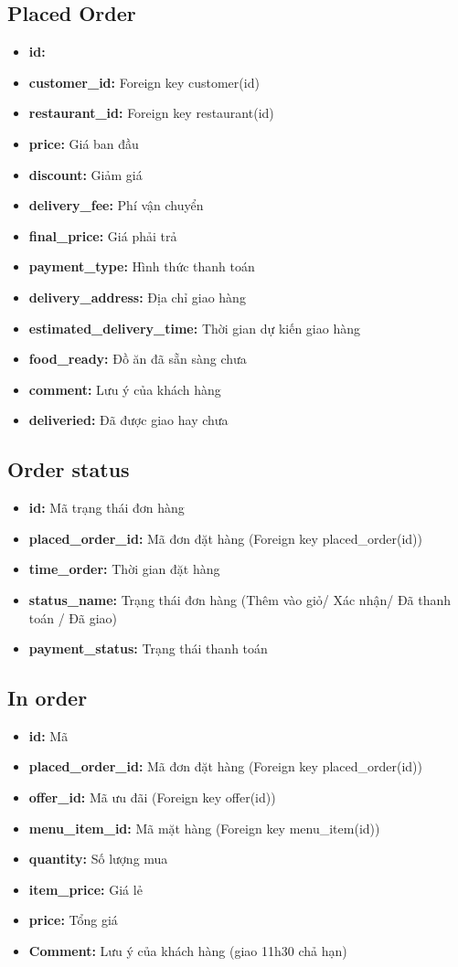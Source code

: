 \documentclass[a4paper,12pt]{article}
\begin{document}
\subsection{Placed Order}
\begin{itemize}
	\item \textbf{id:}
	\item \textbf{customer\_id:} Foreign key customer(id)
	\item \textbf{restaurant\_id:} Foreign key restaurant(id)
	\item \textbf{price:} Giá ban đầu
	\item \textbf{discount:} Giảm giá 
	\item \textbf{delivery\_fee: }Phí vận chuyển
	\item \textbf{final\_price:} Giá phải trả
	\item \textbf{payment\_type:} Hình thức thanh toán
	\item \textbf{delivery\_address:} Địa chỉ giao hàng 
	\item \textbf{estimated\_delivery\_time:} Thời gian dự kiến giao hàng
	\item \textbf{food\_ready:} Đồ ăn đã sẵn sàng chưa
	\item \textbf{comment:} Lưu ý của khách hàng
	\item \textbf{deliveried:} Đã được giao hay chưa
\end{itemize}
\subsection{Order status}
\begin{itemize}
	\item \textbf{id:} Mã trạng thái đơn hàng
	\item \textbf{placed\_order\_id:} Mã đơn đặt hàng (Foreign key placed\_order(id))
	\item \textbf{time\_order:} Thời gian đặt hàng
	\item \textbf{status\_name:} Trạng thái đơn hàng (Thêm vào giỏ/ Xác nhận/ Đã thanh toán / Đã giao)
	\item \textbf{payment\_status:} Trạng thái thanh toán
\end{itemize}
\subsection{In order}
\begin{itemize}
	\item \textbf{id:} Mã
	\item \textbf{placed\_order\_id:} Mã đơn đặt hàng (Foreign key placed\_order(id))
	\item \textbf{offer\_id:} Mã ưu đãi (Foreign key offer(id))
	\item \textbf{menu\_item\_id:} Mã mặt hàng (Foreign key menu\_item(id))
	\item \textbf{quantity:} Số lượng mua
	\item \textbf{item\_price:} Giá lẻ
	\item \textbf{price:} Tổng giá
	\item \textbf{Comment:} Lưu ý của khách hàng (giao 11h30 chả hạn)
\end{itemize}
\end{document}
